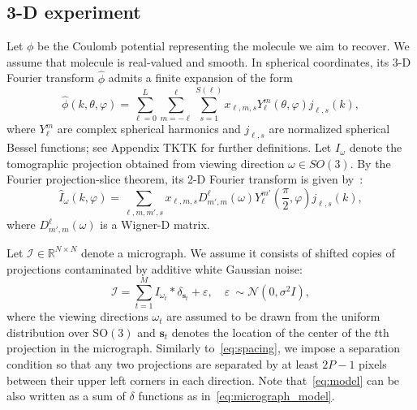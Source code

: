 \documentclass[english,11pt]{article}
\newcommand{\1}{\mathbf{1}}
\newcommand{\II}{\mathcal{I}}
\newcommand{\mb}{\mathbf}
\newcommand{\TODO}[1]{{\color{red}{[#1]}}}
\numberwithin{equation}{section}
\theoremstyle{plain}
\theoremstyle{definition}
\theoremstyle{remark}
\theoremstyle{plain}
\theoremstyle{remark}
\theoremstyle{plain}
\theoremstyle{plain}
\newcommand{\tamir}{x}
\newcommand{\RNN}{\mathbb{R}^{N\times N}}
\newcommand{\be}
{\begin{equation}}
\newcommand{\ee}
{\end{equation}}
\begin{document}
\subsection{3-D experiment}

Let $\phi$ be the Coulomb potential representing the molecule we aim to recover. 
We assume that molecule is real-valued and smooth. In spherical coordinates, its 3-D Fourier transform $\widehat\phi$ admits a finite expansion of the form
\be\label{eq:volume_expansion} 
\widehat \phi(k, \theta, \varphi) = \sum_{\ell = 0}^L\sum_{m=-\ell}^{\ell}\sum_{s=1}^{S(\ell)}\tamir_{\ell, m, s}Y_{\ell}^m(\theta,\varphi)j_{\ell,s}(k),
\ee
where $Y_{\ell}^m$ are complex spherical harmonics and $j_{\ell,s}$ are normalized spherical Bessel functions; see Appendix TKTK for further definitions.  Let $I_{\omega}$ denote the tomographic projection obtained from viewing direction $\omega\in SO(3)$. By the Fourier projection-slice theorem, its 2-D Fourier transform  is given by~\cite{natterer1986mathematics}:
\be\label{eq:projection_model}
\widehat I_{\omega}(k,\varphi) = \sum_{\ell,m,m',s}\tamir_{\ell,m,s}D_{m',m}^{\ell}(\omega)Y_{\ell}^{m'}\left(\frac{\pi}{2},\varphi\right)j_{\ell,s}(k),\ee
where $D_{m',m}^{\ell}(\omega)$ is a Wigner-D matrix.

Let $\II\in\RNN$ denote a micrograph. We assume it consists of shifted copies of projections contaminated by additive white Gaussian noise:
\begin{equation}\label{eq:micrograph_model}
\II = \sum_{t=1}^{M} I_{\omega_t}\ast\delta_{\mb s_t}+ \varepsilon, \quad \varepsilon~\sim\mathcal{N}(0,\sigma^2 I),
\end{equation}
where the viewing directions $\omega_t$ are assumed to be drawn from the uniform distribution over $\text{SO}(3)$ and $\mb s_t$ denotes the location of the center of the $t$th projection in the micrograph. Similarly to~\eqref{eq:spacing}, we impose a separation condition so that any two projections are separated by at least $2P-1$ pixels between their upper left corners  in each direction.
Note that~\eqref{eq:model} can be also written as a sum of $\delta$ functions as in~\eqref{eq:micrograph_model}. 
\end{document}

